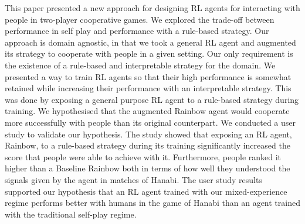 \documentclass[letterpaper]{article} %
\begin{document}
This paper presented a new approach for designing RL agents for interacting with people in two-player cooperative games. 
We explored the trade-off between performance in self play and performance with a rule-based strategy. Our approach is domain agnostic, in that we took a general RL agent and augmented its strategy to cooperate with people in a given setting. Our only requirement is the existence of a rule-based and interpretable strategy for the domain. %
We presented a way to train RL agents so that their high performance is somewhat retained while increasing their performance with an interpretable strategy. This was done by exposing a general purpose  RL agent to a rule-based strategy during training. We hypothesised that the augmented Rainbow agent would cooperate more successfully with people than its original counterpart. 
We conducted a user study to validate our hypothesis. The study showed that exposing an RL agent, Rainbow, to a rule-based strategy during its training significantly increased the score that people were able to achieve with it. Furthermore, people ranked it higher than a Baseline Rainbow both in terms of how well they understood the signals given by the agent in matches of Hanabi. 
The user study results supported our hypothesis that an RL agent trained with our mixed-experience regime performs better with humans in the game of Hanabi than an agent trained with the traditional self-play regime. 


\end{document}

